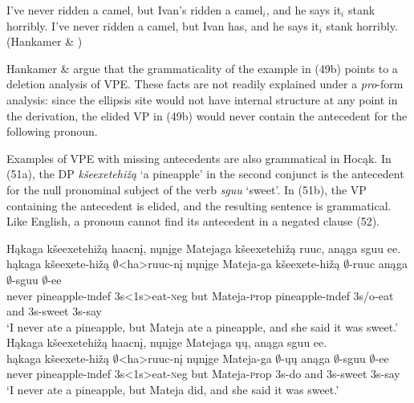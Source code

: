 \documentclass[output=paper]{LSP/langsci}
\begin{document}
\begin{singlespacing}
\begin{exe}
\ex
\begin{xlist}
\ex
I've never ridden a camel, but Ivan's ridden a camel$_i$, and he says it$_i$ stank horribly.
\vspace{12pt}
\ex
I've never ridden a camel, but Ivan has, and he says it$_i$ stank horribly. (Hankamer \& \citealt[403]{Sag1976})
\end{xlist}
\end{exe}
\end{singlespacing}

\begin{exe}
\end{exe}

Hankamer \& \citet{Sag1976} argue that the grammaticality of the example in (49b) points to a deletion analysis of VPE. These facts are not readily explained under a \emph{pro}-form analysis: since the ellipsis site would not have internal structure at any point in the derivation, the elided VP in (49b) would never contain the antecedent for the following pronoun. 

Examples of VPE with missing antecedents are also grammatical in Hocąk. In (51a), the DP \emph{kšeexetehižą} `a pineapple' in the second conjunct is the antecedent for the null pronominal subject of the verb \emph{sguu} `sweet'. In (51b), the VP containing the antecedent is elided, and the resulting sentence is grammatical. Like English, a pronoun cannot find its antecedent in a negated clause (52).

\begin{exe}
\ex
\begin{xlist}
\ex
\glll Hąkaga kšeexetehižą haacnį, nųnįge Matejaga kšeexetehižą ruuc, anąga sguu ee.\\
hąkaga kšeexete-hižą $\emptyset$<ha>ruuc-nį nųnįge Mateja-ga kšeexete-hižą $\emptyset$-ruuc anąga $\emptyset$-sguu $\emptyset$-ee\\
never pineapple-{\textsc indef} {\textsc 3s<1s>}eat-{\textsc neg} but Mateja-{\textsc prop} pineapple-{\textsc indef} {\textsc 3s/o}-eat and {\textsc 3s}-sweet {\textsc 3s}-say\\
\trans `I never ate a pineapple, but Mateja ate a pineapple, and she said it was sweet.'
\ex
\glll Hąkaga kšeexetehižą haacnį, nųnįge Matejaga ųų, anąga sguu ee.\\
hąkaga kšeexete-hižą $\emptyset$<ha>ruuc-nį nųnįge Mateja-ga $\emptyset$-ųų anąga $\emptyset$-sguu $\emptyset$-ee\\
never pineapple-{\textsc indef} {\textsc 3s<1s>}eat-{\textsc neg} but Mateja-{\textsc prop} {\textsc 3s}-do and {\textsc 3s}-sweet {\textsc 3s}-say\\
\trans `I never ate a pineapple, but Mateja did, and she said it was sweet.'
\end{xlist}
\end{exe}
\end{document}
